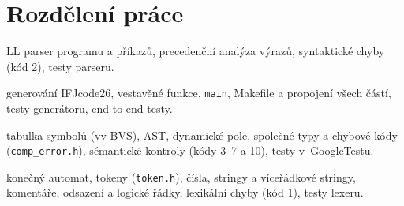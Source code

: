 \section{Rozdělení práce}\label{sec:tym}

\begin{description}[style=nextline]
  \item[Dušan Popović]
    LL parser programu a příkazů, precedenční analýza výrazů,
    syntaktické chyby (kód 2), testy parseru.

  \item[Marek Záchenský]
    generování IFJcode26, vestavěné funkce, \texttt{main}, Makefile
    a propojení všech částí, testy generátoru, end-to-end testy.

  \item[Adam Zatloukal]
    tabulka symbolů (vv-BVS), AST, dynamické pole, společné typy
    a chybové kódy (\texttt{comp\_error.h}), sémantické kontroly
    (kódy 3--7 a 10), testy v~GoogleTestu.

  \item[Tadeáš Zonyga]
    konečný automat, tokeny (\texttt{token.h}), čísla, stringy
    a víceřádkové stringy, komentáře, odsazení a logické řádky,
    lexikální chyby (kód 1), testy lexeru.
\end{description}
